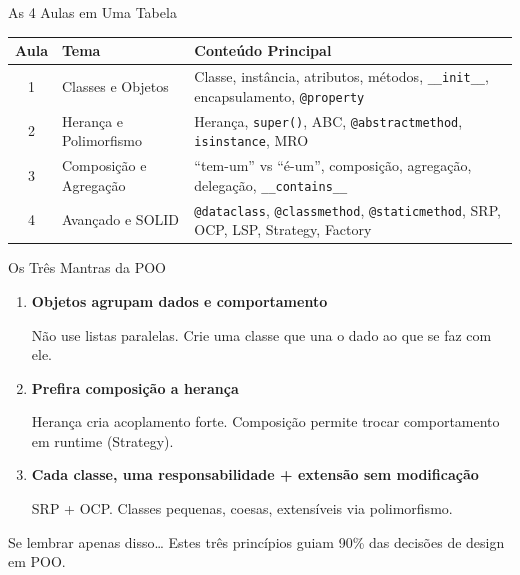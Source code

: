 \documentclass[aspectratio=169]{beamer}
\begin{document}
\begin{frame}{As 4 Aulas em Uma Tabela}
\begin{table}
\centering
\scriptsize
\begin{tabular}{clp{7cm}}
\toprule
\textbf{Aula} & \textbf{Tema} & \textbf{Conteúdo Principal} \\
\midrule
1 & Classes e Objetos    & Classe, instância, atributos, métodos, \texttt{\_\_init\_\_}, encapsulamento, \texttt{@property} \\
2 & Herança e Polimorfismo & Herança, \texttt{super()}, ABC, \texttt{@abstractmethod}, \texttt{isinstance}, MRO \\
3 & Composição e Agregação & ``tem-um'' vs ``é-um'', composição, agregação, delegação, \texttt{\_\_contains\_\_} \\
4 & Avançado e SOLID       & \texttt{@dataclass}, \texttt{@classmethod}, \texttt{@staticmethod}, SRP, OCP, LSP, Strategy, Factory \\
\bottomrule
\end{tabular}
\end{table}
\end{frame}

\begin{frame}{Os Três Mantras da POO}
\begin{enumerate}
  \item \textbf{Objetos agrupam dados e comportamento}

  Não use listas paralelas. Crie uma classe que una o dado ao que se faz com ele.

  \item \textbf{Prefira composição a herança}

  Herança cria acoplamento forte. Composição permite trocar comportamento em runtime (Strategy).

  \item \textbf{Cada classe, uma responsabilidade + extensão sem modificação}

  SRP + OCP. Classes pequenas, coesas, extensíveis via polimorfismo.
\end{enumerate}

\begin{exampleblock}{Se lembrar apenas disso\ldots}
Estes três princípios guiam 90\% das decisões de design em POO.
\end{exampleblock}
\end{frame}
\end{document}

